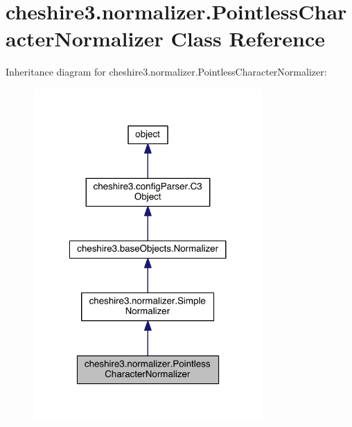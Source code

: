 \hypertarget{classcheshire3_1_1normalizer_1_1_pointless_character_normalizer}{\section{cheshire3.\-normalizer.\-Pointless\-Character\-Normalizer Class Reference}
\label{classcheshire3_1_1normalizer_1_1_pointless_character_normalizer}
}


Inheritance diagram for cheshire3.\-normalizer.\-Pointless\-Character\-Normalizer\-:
\nopagebreak
\begin{figure}[H]
\begin{center}
\leavevmode
\includegraphics[width=248pt]{classcheshire3_1_1normalizer_1_1_pointless_character_normalizer__inherit__graph}
\end{center}
\end{figure}


